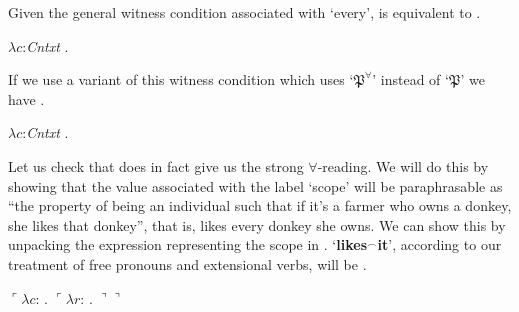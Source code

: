 Given the general witness condition associated with `every', \preveg{} is
equivalent to \nexteg{}.
\begin{ex} 
  $\lambda c$:\textit{Cntxt} . 
\end{ex}
If we use a variant of this witness condition which uses
`$\mathfrak{P}^\forall$' instead of `$\mathfrak{P}$' we have
\nexteg{}.
\begin{ex} 
  $\lambda c$:\textit{Cntxt} . 
  \label{ex:efwoadli-classic}
\end{ex}
Let us check that \preveg{} does in fact give us the strong
$\forall$-reading.  We will do this by showing that the value
associated with the label `scope' will be paraphrasable as ``the
property of being an individual such that if it's a farmer who owns a
donkey, she likes that donkey'', that is, likes every donkey she
owns. We can show this by unpacking the expression representing the
scope in \preveg{}.  `\textbf{likes}$^\frown$\textbf{it}', according to
our treatment of free pronouns and extensional verbs, will be
\nexteg{}.
\begin{ex} 
  $\ulcorner\lambda c$: .
  $\ulcorner\lambda r$: . $\urcorner\urcorner$
\end{ex}
